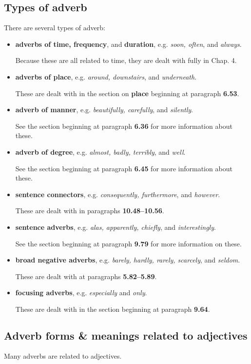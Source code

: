 \documentclass[oneside]{book}
\numberwithin{equation}{section}
\begin{document}
\subsection{Types of adverb}
\noindent{} There are several types of adverb:
\begin{itemize}
    \item \textbf{adverbs of time, frequency}, and \textbf{duration}, e.g. \textit{soon, often}, and \textit{always}.
    
    Because these are all related to time, they are dealt with fully in Chap. 4.
    \item \textbf{adverbs of place}, e.g. \textit{around, downstairs}, and \textit{underneath}.
    
    These are dealt with in the section on \textbf{place} beginning at paragraph \textbf{6.53}.
    \item \textbf{adverb of manner}, e.g. \textit{beautifully, carefully}, and \textit{silently}.
    
    See the section beginning at paragraph \textbf{6.36} for more information about these.
    \item \textbf{adverb of degree}, e.g. \textit{almost, badly, terribly}, and \textit{well}.
    
    See the section beginning at paragraph \textbf{6.45} for more information about these.
    \item \textbf{sentence connectors}, e.g. \textit{consequently, furthermore}, and \textit{however}.
    
    These are dealt with in paragraphs \textbf{10.48--10.56}.
    \item \textbf{sentence adverbs}, e.g. \textit{alas, apparently, chiefly}, and \textit{interestingly}.
    
    See the section beginning at paragraph \textbf{9.79} for more information on these.
    \item \textbf{broad negative adverbs}, e.g. \textit{barely, hardly, rarely, scarcely}, and \textit{seldom}.
    
    These are dealt with at paragraphs \textbf{5.82--5.89}.
    \item \textbf{focusing adverbs}, e.g. \textit{especially} and \textit{only}.
    
    These are dealt with in the section beginning at paragraph \textbf{9.64}.
\end{itemize}

\subsection{Adverb forms \& meanings related to adjectives}
\noindent{} Many adverbs are related to adjectives.
\end{document}
